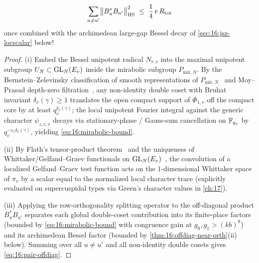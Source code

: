 \begin{proposition}
\begin{enumerate}[label=\textup{(\roman*)}]
  \begin{equation}
  \label{eq:16:pair-offdiag}
    \sum_{u \neq u'} \bigl\|B_u^* B_{u'}\bigr\|_{\mathrm{HS}}^2 \;\le\; \frac{1}{4}\, e\, R_{\mathrm{tot}}
  \end{equation}
  once combined with the archimedean large-gap Bessel decay of \cref{sec:16:jsz-locscalar} below!
\end{enumerate}
\end{proposition}

\begin{proof}
(i) Embed the Bessel unipotent radical $N_{r, v}$ into the maximal unipotent subgroup $U_N \subset \mathrm{GL}_N(E_v)$ inside the mirabolic subgroup $P_{\mathrm{mir}, N}$. By the Bernstein--Zelevinsky classification of smooth representations of $P_{\mathrm{mir}, N}$~\cite{BernsteinZelevinsky1977} and Moy--Prasad depth-zero filtration~\cite{MoyPrasad1994}, any non-identity double coset with Bruhat invariant $\delta_v(\gamma) \ge 1$ translates the open compact support of $\Phi_{1, v}$ off the compact core by at least $q_v^{\delta_v(\gamma)}$; the local unipotent Fourier integral against the generic character $\psi_{z,c,v}$ decays via stationary-phase / Gauss-sum cancellation on $\mathbb{F}_{q_v}$ by $q_v^{-c_1 \delta_v(\gamma)}$, yielding \eqref{eq:16:mirabolic-bound}.

(ii) By Flath's tensor-product theorem~\cite{Flath1979} and the uniqueness of Whittaker/Gelfand--Graev functionals on $\mathrm{GL}_N(E_v)$~\cite{BernsteinZelevinsky1977}, the convolution of a localized Gelfand--Graev test function acts on the $1$-dimensional Whittaker space of $\pi_v$ by a scalar equal to the normalized local character trace (explicitly evaluated on supercuspidal types via Green's character values in \cref{ch:17}).

(iii) Applying the row-orthogonality splitting operator to the off-diagonal product $B_u^* B_{u'}$ separates each global double-coset contribution into its finite-place factors (bounded by \eqref{eq:16:mirabolic-bound} with congruence gain at $g_0, g_1 > (k b)^8$) and its archimedean Bessel factor (bounded by \cref{thm:16:offdiag-near-orth}(ii) below). Summing over all $u \neq u'$ and all non-identity double cosets gives \eqref{eq:16:pair-offdiag}.
\end{proof}

